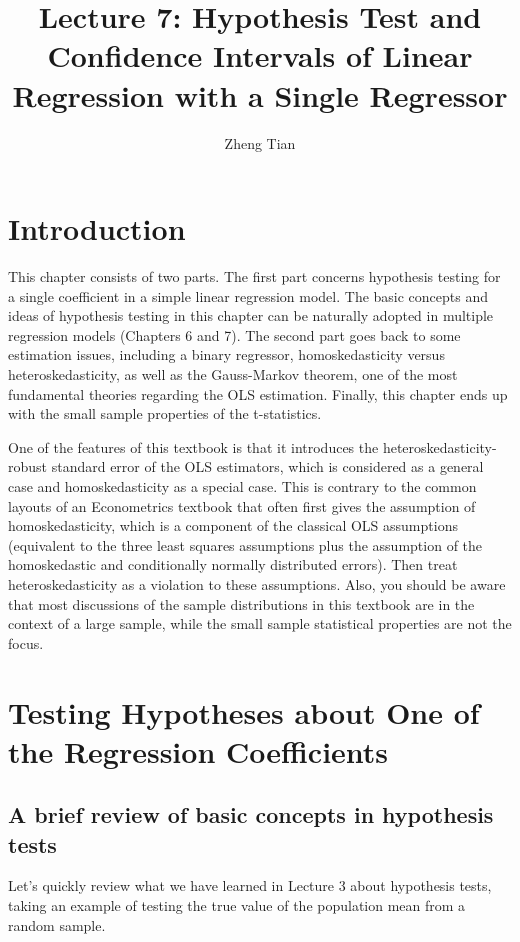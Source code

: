 \documentclass[a4paper,11pt]{article}
\author{Zheng Tian}
\date{}
\title{Lecture 7: Hypothesis Test and Confidence Intervals of Linear Regression with a Single Regressor}
\begin{document}
\maketitle
\setcounter{tocdepth}{1}
\tableofcontents



\section{Introduction}
\label{sec:org09bfbb0}

This chapter consists of two parts. The first part concerns hypothesis
testing for a single coefficient in a simple linear regression
model. The basic concepts and ideas of hypothesis testing in this
chapter can be naturally adopted in multiple regression models
(Chapters 6 and 7). The second part goes back to some estimation
issues, including a binary regressor, homoskedasticity versus
heteroskedasticity, as well as the Gauss-Markov theorem, one of the
most fundamental theories regarding the OLS estimation. Finally,
this chapter ends up with the small sample properties of the
t-statistics.

One of the features of this textbook is that it introduces the
heteroskedasticity-robust standard error of the OLS estimators, which
is considered as a general case and homoskedasticity as a special
case. This is contrary to the common layouts of an Econometrics
textbook that often first gives the assumption of homoskedasticity,
which is a component of the classical OLS assumptions (equivalent to
the three least squares assumptions plus the assumption of the
homoskedastic and conditionally normally distributed errors). Then
treat heteroskedasticity as a violation to these assumptions. Also,
you should be aware that most discussions of the sample distributions
in this textbook are in the context of a large sample, while the small
sample statistical properties are not the focus.


\section{Testing Hypotheses about One of the Regression Coefficients}
\label{sec:org3cd92ec}

\subsection{A brief review of basic concepts in hypothesis tests}
\label{sec:orgd4f6737}

Let's quickly review what we have learned in Lecture 3 about
hypothesis tests, taking an example of testing the true value of the
population mean from a random sample.
\end{document}
